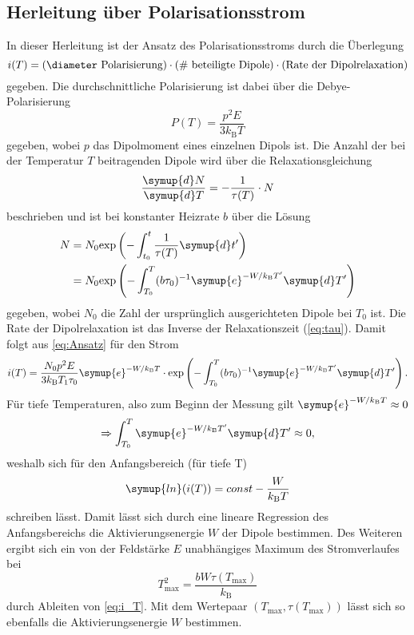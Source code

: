 \subsection{Herleitung über Polarisationsstrom}
\label{sec:Herleitung_Polarisationsstrom}
In dieser Herleitung ist der Ansatz des Polarisationsstroms durch die Überlegung 
\begin{equation}
    \label{eq:Ansatz}
    i(T) = \text{(\diameter Polarisierung)} \cdot \text{(\# beteiligte Dipole)} \cdot \text{(Rate der Dipolrelaxation)}
\end{equation} 
gegeben.
Die durchschnittliche Polarisierung ist dabei über die Debye-Polarisierung
\begin{equation*}
    \label{eq:debye}
    P(T) = \frac{p^2 E}{3k_\text{B} T}
\end{equation*}
gegeben, wobei $p$ das Dipolmoment eines einzelnen Dipols ist. Die Anzahl der bei der Temperatur $T$ beitragenden Dipole wird über die Relaxationsgleichung 
\begin{equation*}
\frac{\symup{d}N}{\symup{d}T} = -\frac{1}{\tau(T)} \cdot N
\end{equation*}
beschrieben und ist bei konstanter Heizrate $b$ über die Lösung 
\begin{align*}
N &=  N_0 \text{exp}\left(-\int_{t_0}^t \frac{1}{\tau(T)} \symup{d}t'\right) \\
&= N_0 \text{exp}\left( -\int_{T_0}^T (b\tau_0)^{-1} \symup{e}^{-W/k_\text{B}T'} \symup{d}T' \right)
\end{align*}
gegeben, wobei $N_0$ die Zahl der ursprünglich ausgerichteten Dipole bei $T_0$ ist. 
Die Rate der Dipolrelaxation ist das Inverse der Relaxationszeit (\autoref{eq:tau}).
Damit folgt aus \autoref{eq:Ansatz} für den Strom 
\begin{equation}
    \label{eq:i_T}
    i(T) = \frac{N_0 p^2 E}{3k_\text{B}T_1 \tau_0} \symup{e}^{-W/k_\text{B} T} \cdot \text{exp}\left( -\int_{T_0}^T (b\tau_0)^{-1} \symup{e}^{-W/k_\text{B}T'} \symup{d}T' \right).
\end{equation}
Für tiefe Temperaturen, also zum Beginn der Messung gilt $\symup{e}^{-W/k_\text{B}T} \approx 0$
\begin{equation*}
    \Rightarrow \int_{T_0}^T \symup{e}^{-W/k_\text{B}T'} \symup{d}T' \approx 0,
\end{equation*}
weshalb sich für den Anfangsbereich (für tiefe T)
\begin{equation}
    \label{eq:W1}
    \symup{ln}(i(T)) = const - \frac{W}{k_\text{B}T}
\end{equation}
schreiben lässt. Damit lässt sich durch eine lineare Regression des Anfangsbereichs die Aktivierungsenergie $W$ der Dipole bestimmen.
Des Weiteren ergibt sich ein von der Feldstärke $E$ unabhängiges Maximum des Stromverlaufes bei 
\begin{equation}
    \label{eq:T_max}
    T_\text{max}^2 = \frac{b W \tau(T_\text{max})}{k_\text{B}}
\end{equation}
durch Ableiten von \autoref{eq:i_T}. Mit dem Wertepaar $(T_\text{max}, \tau(T_\text{max}))$ lässt sich so ebenfalls die Aktivierungsenergie $W$ bestimmen.

